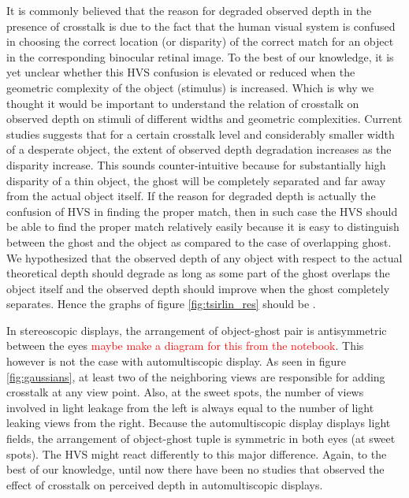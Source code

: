 It is commonly believed that the reason for degraded observed depth in the presence of crosstalk is due to the fact that the human visual system is confused in choosing the correct location (or disparity) of the correct match for an object in the corresponding binocular retinal image. To the best of our knowledge, it is yet unclear whether this HVS confusion is elevated or reduced when the geometric complexity of the object (stimulus) is increased.  Which is why we thought it would be important to understand the relation of crosstalk on observed depth on stimuli of different widths and geometric complexities. Current studies suggests that for a certain crosstalk level and considerably smaller width of a desperate object, the extent of observed depth degradation increases as the disparity increase. This sounds counter-intuitive because for substantially high disparity of a thin object, the ghost will be completely separated and far away from the actual object itself. If the reason for degraded depth is actually the confusion of HVS in finding the proper match, then in such case the HVS should be able to find the proper match relatively easily because it is easy to distinguish between the ghost and the object as compared to the case of overlapping ghost. We hypothesized that the observed depth of any object with respect to the actual theoretical depth should degrade as long as some part of the ghost overlaps the object itself and the observed depth should improve when the ghost completely separates. Hence the graphs of figure \ref{fig:tsirlin_res} should be .

In stereoscopic displays, the arrangement of object-ghost pair is antisymmetric between the eyes \textcolor{red}{maybe make a diagram for this from the notebook}. This however is not the case with automultiscopic display. As seen in figure \ref{fig:gaussians}, at least two of the neighboring views are responsible for adding crosstalk at any view point. Also, at the sweet spots, the number of views involved in light leakage from the left is always equal to the number of light leaking views from the right. Because the automultiscopic display displays light fields, the arrangement of object-ghost tuple is symmetric in both eyes (at sweet spots). The HVS might react differently to this major difference. Again, to the best of our knowledge, until now there have been no studies that observed the effect of crosstalk on perceived depth in automultiscopic displays.\pagebreak

